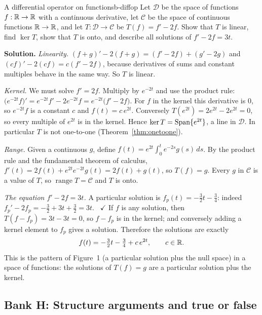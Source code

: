 \documentclass[11pt]{article}
\begin{document}
\begin{exmp}{A differential operator on functions}{b-diffop}
Let $\mathcal{D}$ be the space of functions $f:\mathbb{R}\to\mathbb{R}$ with a continuous derivative, let $\mathcal{C}$ be the space of continuous functions $\mathbb{R}\to\mathbb{R}$, and let $T:\mathcal{D}\to\mathcal{C}$ be $T(f)=f'-2f$. Show that $T$ is linear, find $\ker T$, show that $T$ is onto, and describe all solutions of $f'-2f=3t$.

\textbf{Solution.} \emph{Linearity.} $(f+g)'-2(f+g)=(f'-2f)+(g'-2g)$ and $(cf)'-2(cf)=c(f'-2f)$, because derivatives of sums and constant multiples behave in the same way. So $T$ is linear.

\emph{Kernel.} We must solve $f'=2f$. Multiply by $e^{-2t}$ and use the product rule: $\bigl(e^{-2t}f\bigr)'=e^{-2t}f'-2e^{-2t}f=e^{-2t}\bigl(f'-2f\bigr)$. For $f$ in the kernel this derivative is $0$, so $e^{-2t}f$ is a constant $c$ and $f(t)=c\,e^{2t}$. Conversely $T(e^{2t})=2e^{2t}-2e^{2t}=0$, so every multiple of $e^{2t}$ is in the kernel. Hence $\ker T=\operatorname{Span}\{e^{2t}\}$, a line in $\mathcal{D}$. In particular $T$ is not one-to-one (Theorem~\ref{thm:onetoone}).

\emph{Range.} Given a continuous $g$, define $f(t)=e^{2t}\int_0^te^{-2s}g(s)\,ds$. By the product rule and the fundamental theorem of calculus, $f'(t)=2f(t)+e^{2t}e^{-2t}g(t)=2f(t)+g(t)$, so $T(f)=g$. Every $g$ in $\mathcal{C}$ is a value of $T$, so $\operatorname{range}T=\mathcal{C}$ and $T$ is onto.

\emph{The equation $f'-2f=3t$.} A particular solution is $f_p(t)=-\tfrac32t-\tfrac34$: indeed $f_p'-2f_p=-\tfrac32+3t+\tfrac32=3t$. \ $\checkmark$ If $f$ is any solution, then $T(f-f_p)=3t-3t=0$, so $f-f_p$ is in the kernel; and conversely adding a kernel element to $f_p$ gives a solution. Therefore the solutions are exactly
\[
f(t)=-\tfrac32t-\tfrac34+c\,e^{2t},\qquad c\in\mathbb{R}.
\]
This is the pattern of Figure~1 (a particular solution plus the null space) in a space of functions: the solutions of $T(f)=g$ are a particular solution plus the kernel.
\end{exmp}

\subsection*{Bank H: Structure arguments and true or false}
\end{document}
